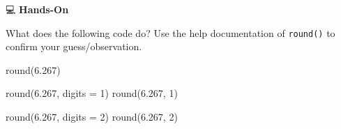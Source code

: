 \documentclass[
  letterpaper,
  DIV=11,
  numbers=noendperiod]{scrreprt}
\newenvironment{Shaded}{\begin{snugshade}}{\end{snugshade}}
\newcommand{\AttributeTok}[1]{\textcolor[rgb]{0.40,0.45,0.13}{#1}}
\newcommand{\DecValTok}[1]{\textcolor[rgb]{0.68,0.00,0.00}{#1}}
\newcommand{\FloatTok}[1]{\textcolor[rgb]{0.68,0.00,0.00}{#1}}
\newcommand{\FunctionTok}[1]{\textcolor[rgb]{0.28,0.35,0.67}{#1}}
\newcommand{\NormalTok}[1]{\textcolor[rgb]{0.00,0.23,0.31}{#1}}
\begin{document}
💻 \textbf{Hands-On}

What does the following code do? Use the help documentation of
\texttt{round()} to confirm your guess/observation.

\begin{Shaded}
\begin{Highlighting}[]
\FunctionTok{round}\NormalTok{(}\FloatTok{6.267}\NormalTok{)}

\FunctionTok{round}\NormalTok{(}\FloatTok{6.267}\NormalTok{, }\AttributeTok{digits =} \DecValTok{1}\NormalTok{)}
\FunctionTok{round}\NormalTok{(}\FloatTok{6.267}\NormalTok{, }\DecValTok{1}\NormalTok{)}

\FunctionTok{round}\NormalTok{(}\FloatTok{6.267}\NormalTok{, }\AttributeTok{digits =} \DecValTok{2}\NormalTok{)}
\FunctionTok{round}\NormalTok{(}\FloatTok{6.267}\NormalTok{, }\DecValTok{2}\NormalTok{)}
\end{Highlighting}
\end{Shaded}
\end{document}
